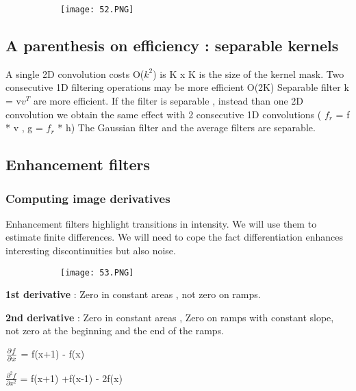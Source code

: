 \documentclass{article}
\begin{document}
\begin{figure}[ht!]
  \centering
  \begin{subfigure}[b]{0.45\linewidth}
    \texttt{[image: 52.PNG]}
  \end{subfigure}
\end{figure}


\subsection{A parenthesis on efficiency : separable kernels}

A single 2D convolution costs O($k^2$) is K x K is the size of the kernel mask.
Two consecutive 1D filtering operations may be more efficient O(2K)
Separable filter k = v$v^T$ are more efficient.
If the filter is separable , instead than one 2D convolution we obtain the same effect with 2 consecutive 1D convolutions ( $f_r$ = f * v  , g = $f_r$ * h)
The Gaussian filter and the average filters are separable.

\subsection{Enhancement filters}
\subsubsection{Computing image derivatives}

Enhancement filters highlight transitions in intensity.
We will use them to estimate finite differences.
We will need to cope the fact differentiation enhances interesting discontinuities but also noise.

\begin{figure}[ht!]
  \centering
  \begin{subfigure}[b]{0.80\linewidth}
    \texttt{[image: 53.PNG]}
  \end{subfigure}
\end{figure}

\vspace{40mm}

\textbf{1st derivative} : Zero in constant areas , not zero on ramps.

\textbf{2nd derivative} : Zero in constant areas , Zero on ramps with constant slope, not zero at the beginning and the end of the ramps.

$\pdv{f}{x}$ = f(x+1) - f(x)


$\frac{\partial^2 f}{\partial x^2}$ = f(x+1) +f(x-1) - 2f(x)
\end{document}
